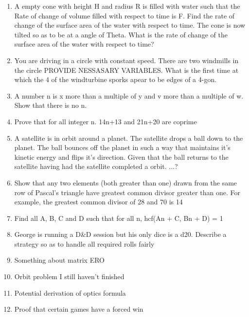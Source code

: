 \documentclass[a4paper]{article}
\begin{document}
\begin{enumerate}
\item
A empty cone with height H and radius R is filled with water such that the
 Rate of change of volume filled with respect to time is F. Find the rate of change of the surface area of the water with respect to time. The cone is now tilted so as to be at a angle of Theta. What is the rate of change of the surface area of the water with respect to time?

\item
You are driving in a circle with constant speed. There are two windmills in the circle PROVIDE NESSASARY VARIABLES. What is the first time at which the 4 of the windturbine sporks apear to be edges of a 4-gon.

\item
A number n is x more than a multiple of y and v more than a multiple of w. Show that there is no n.

\item
Prove that for all integer n. 14n+13 and 21n+20 are coprime

\item
A satellite is in orbit around a planet. The satellite drops a ball down to the planet. The ball bounces off the planet in such a way that maintains it’s kinetic energy and flips it’s direction. Given that the ball returns to the satellite having had the satellite completed a orbit. ...?

\item
Show that any two elements (both greater than one) drawn from the same row of Pascal's triangle have greatest common divisor greater than one.  For example, the greatest common divisor of 28 and 70 is 14

\item
Find all A, B, C and D such that for all n, hcf(An + C, Bn + D) = 1

\item
George is running a D\&D session but his only dice is a d20. Describe a strategy so as to handle all required rolls fairly

\item
Something about matrix ERO

\item
Orbit problem I still haven't finished

\item
Potential derivation of optics formula

\item
Proof that certain games have a forced win


\end{enumerate}
\end{document}

